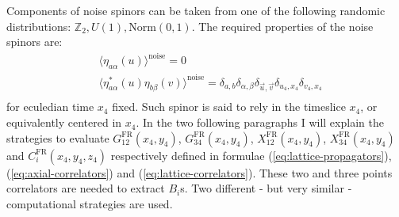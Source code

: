 \documentclass[english, LaM, oneside, noexaminfo]{sapthesis}
\begin{document}
Components of noise spinors can be taken from one of the following randomic distributions: $\mathbb{Z}_2, U(1), \text{Norm}(0,1)$.
The required properties of the noise spinors are:
\begin{equation}\label{eq:eta-properties}
    \begin{split}
        & \langle \eta_{a\alpha} (u) \rangle^{\text{noise}} = 0 \\
        & \langle \eta^{*}_{a\alpha} (u) \eta_{b\beta} (v) \rangle^{\text{noise}} = \delta_{a,b} \delta_{\alpha,\beta} \delta_{\vec u, \vec v} \delta_{u_4,x_4} \delta_{v_4,x_4} \\
    \end{split}
\end{equation}
for eculedian time $x_4$ fixed.
Such spinor is said to rely in the timeslice $x_4$, or equivalently centered in $x_4$.
\newline
In the two following paragraphs I will explain the strategies to evaluate $G_{12}^\text{FR}(x_4,y_4)$, $G_{34}^\text{FR}(x_4,y_4)$, $X_{12}^\text{FR}(x_4,y_4)$, $X_{34}^\text{FR}(x_4,y_4)$ and $C_i^\text{FR}(x_4,y_4,z_4)$ respectively defined in formulae (\ref{eq:lattice-propagators}), (\ref{eq:axial-correlators}) and (\ref{eq:lattice-correlators}).
These two and three points correlators are needed to extract $B_i$s.
Two different - but very similar - computational strategies are used.
\end{document}
